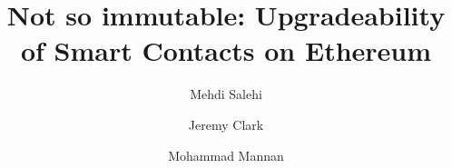 \documentclass[envcountsect]{llncs}
\begin{document}
\frontmatter
\mainmatter

\title{Not so immutable: Upgradeability of Smart Contacts on Ethereum}
\author{Mehdi Salehi \and Jeremy Clark \and Mohammad Mannan}

\maketitle







%
%






\clearpage
\appendix

%

\end{document}
